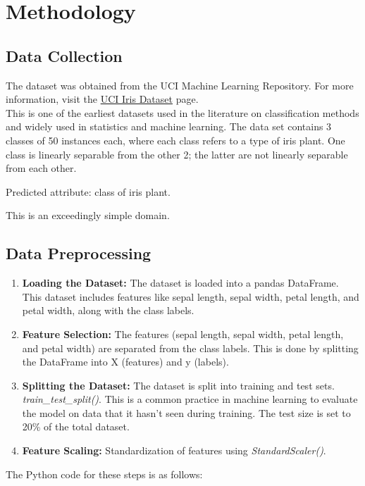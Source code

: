 \documentclass[a4paper]{article}
\begin{document}
\section{Methodology}
\subsection{Data Collection}
The dataset was obtained from the UCI Machine Learning Repository. For more information, visit the \href{https://archive.ics.uci.edu/ml/datasets/iris}{UCI Iris Dataset} page.\\
This is one of the earliest datasets used in the literature on classification methods and widely used in statistics and machine learning.  The data set contains 3 classes of 50 instances each, where each class refers to a type of iris plant.  One class is linearly separable from the other 2; the latter are not linearly separable from each other.

Predicted attribute: class of iris plant.

This is an exceedingly simple domain.

\subsection{Data Preprocessing}
\begin{enumerate}
	\item \textbf{Loading the Dataset:} The dataset is loaded into a pandas DataFrame. This dataset includes features like sepal length, sepal width, petal length, and petal width, along with the class labels.
	\item \textbf{Feature Selection:} The features (sepal length, sepal width, petal length, and petal width) are separated from the class labels. This is done by splitting the DataFrame into X (features) and y (labels).
	\item \textbf{Splitting the Dataset:} The dataset is split into training and test sets.
	\textit{train\_test\_split()}. This is a common practice in machine learning to evaluate the model on data that it hasn't seen during training. The test size is set to 20\% of the total dataset.
	
	\item \textbf{Feature Scaling:} Standardization of features using \textit{StandardScaler()}.
\end{enumerate}
The Python code for these steps is as follows:
\end{document}

